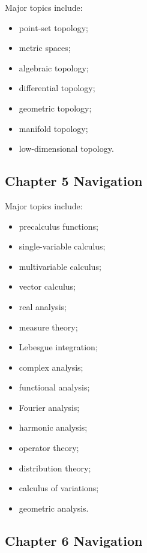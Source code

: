 Major topics include:

\begin{itemize}
    \item point-set topology;
    \item metric spaces;
    \item algebraic topology;
    \item differential topology;
    \item geometric topology;
    \item manifold topology;
    \item low-dimensional topology.
\end{itemize}

\subsection{Chapter 5 Navigation}
\label{subsec:index-chapter-five}

Major topics include:

\begin{itemize}
    \item precalculus functions;
    \item single-variable calculus;
    \item multivariable calculus;
    \item vector calculus;
    \item real analysis;
    \item measure theory;
    \item Lebesgue integration;
    \item complex analysis;
    \item functional analysis;
    \item Fourier analysis;
    \item harmonic analysis;
    \item operator theory;
    \item distribution theory;
    \item calculus of variations;
    \item geometric analysis.
\end{itemize}

\subsection{Chapter 6 Navigation}
\label{subsec:index-chapter-six}

